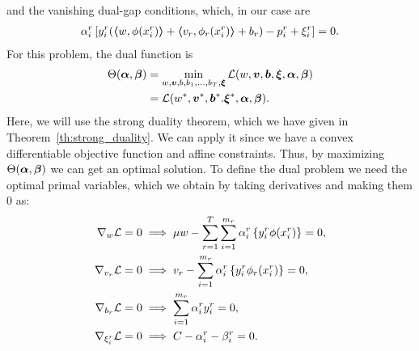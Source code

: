 and the vanishing dual-gap conditions, which, in our case are
\begin{align}
    \alpha_i^r \left[ y_{i}^r (\dotp{w}{\phi(x_{i}^r)} + \dotp{v_r}{\phi_r(x_{i}^r)} + b_r) - p_{i}^r + \xi_{i}^r \right] = 0 . \label{eq:dualgap_vanish}
\end{align}
For this problem, the dual function is
\begin{equation}\nonumber
    \begin{aligned}
         \Theta(\bm{\alpha}, \bm{\beta}) &=  \min_{{w}, \bm{v}, b, b_1, \ldots, b_T, \bm{\xi}} \mathcal{L}({w}, \bm{v}, \bm{b}, \bm{\xi}, \bm{\alpha}, \bm{\beta}) \\
         &= \mathcal{L}({{w}}^*, {\bm{v}}^*, {\bm{b}}^*. {\bm{\xi}}^*, \bm{\alpha}, \bm{\beta}) .
    \end{aligned}    
\end{equation}
Here, we will use the strong duality theorem, which we have given in Theorem~\ref{th:strong_duality}. We can apply it since we have a convex differentiable objective function and affine constraints.
Thus, by maximizing $\Theta(\bm{\alpha}, \bm{\beta})$ we can get an optimal solution.
To define the dual problem we need the optimal primal variables, which we obtain by taking derivatives and making them $0$ as:
\begin{align}
    \grad_{{w}} \lagr  = 0  &\implies \mu {{w}} - \sum_{r= 1}^T \sum_{i=1}^{m_r} {\alpha_i^r} \left\lbrace y_i^r \phi(x_i^r) \right\rbrace = 0 , \label{eq:common_repr_add} \\
    \grad_{{v}_r} \lagr  = 0 &\implies {{v}_r} - \sum_{i=1}^{m_r} {\alpha_i^r} \left\lbrace y_i^r \phi_r(x_i^r) \right\rbrace = 0 , \label{eq:specific_repr_add} \\
    \grad_{b_r} \lagr  = 0 &\implies \sum_{i=1}^{m_r} {\alpha_i^r} y_i^r = 0 , \label{eq:specific_eqconstr_add} \\
    \grad_{\xi_i^r} \lagr  = 0 &\implies C - {\alpha_i^r} - {\beta_i^r} = 0 .\label{eq:xi_feas_add}
\end{align}
